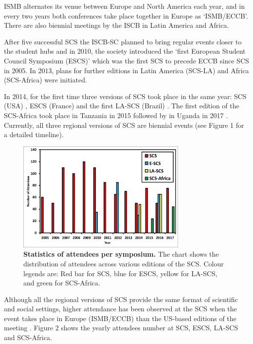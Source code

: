 \documentclass[]{article}%
\begin{document}
	ISMB alternates its venue between Europe and North America each year, and in every two years both conferences take place together in Europe as `ISMB/ECCB'. There are also biennial meetings by the ISCB in Latin America and Africa. 
	
	After five successful SCS the ISCB-SC planned to bring regular events closer to the student hubs and in 2010, the society introduced the `first European Student Council Symposium (ESCS)' \citep{Moreau2010} which was the first SCS to precede ECCB since SCS in 2005. In 2013, plans for further editions in Latin America (SCS-LA) and Africa (SCS-Africa) were initiated.
	
	In 2014, for the first time three versions of SCS took place in the same year: SCS (USA) \citep{Rahman2015}, ESCS (France) \citep{Francescatto2015} and the first LA-SCS  (Brazil) \citep{Parra2015}. The first edition of the SCS-Africa took place in Tanzania in 2015 \citep{souilmi2015} followed by in Uganda in 2017 \citep{rafael2017}. Currently, all three regional versions of SCS are biennial events (see Figure 1 for a detailed timeline). \\
	
	\begin{figure}
		\centering
		\includegraphics[width=0.75\textwidth]{figure2.pdf}
		\caption{\textbf{Statistics of attendees per symposium.}
			The chart shows the distribution of attendees across various editions of the SCS. Colour legends are: Red bar for SCS, blue for ESCS, yellow for LA-SCS, and  green for SCS-Africa.
		}
	\end{figure}
	
	
	Although all the regional versions of SCS provide the same format of scientific and social settings, higher attendance has been observed at the SCS when the event takes place in Europe (ISMB/ECCB) than the US-based editions of the meeting \citep{cuypers2016}. Figure 2 shows the yearly attendees number at SCS, ESCS, LA-SCS and SCS-Africa. \\
\end{document}
